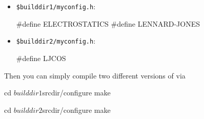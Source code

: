 \begin{itemize}
\item \texttt{\$builddir1/myconfig.h}:
\begin{code}
#define ELECTROSTATICS
#define LENNARD-JONES
\end{code}

\item \texttt{\$builddir2/myconfig.h}:
\begin{code}
#define LJCOS
\end{code}
\end{itemize}

\noindent Then you can simply compile two different versions of \es via
\begin{code}
cd $builddir1
$srcdir/configure
make

cd $builddir2
$srcdir/configure
make
\end{code}


